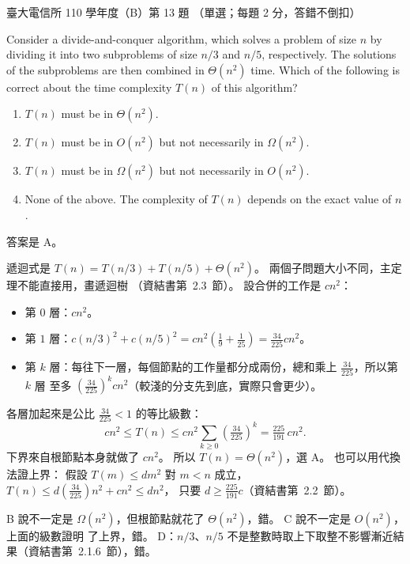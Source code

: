 \begin{pastexam}[label={px:ntu-110-comm-dsa-13}]{臺大電信所 110 學年度（B）第 13 題}
（單選；每題 2 分，答錯不倒扣）

Consider a divide-and-conquer algorithm, which solves a problem of size $n$ by dividing it into two subproblems of size $n/3$ and $n/5$, respectively. The solutions of the subproblems are then combined in $\Theta(n^2)$ time. Which of the following is correct about the time complexity $T(n)$ of this algorithm?
\begin{enumerate}[label=\Alph*.]
\item $T(n)$ must be in $\Theta(n^2)$.
\item $T(n)$ must be in $O(n^2)$ but not necessarily in $\Omega(n^2)$.
\item $T(n)$ must be in $\Omega(n^2)$ but not necessarily in $O(n^2)$.
\item None of the above. The complexity of $T(n)$ depends on the exact value of $n$.
\end{enumerate}
\end{pastexam}

\begin{pastsoln}
答案是 A。

遞迴式是 $T(n) = T(n/3) + T(n/5) + \Theta(n^2)$。 兩個子問題大小不同，主定理不能直接用，畫遞迴樹
（資結書第~2.3~節）。 設合併的工作是 $cn^2$：
\begin{itemize}
\item 第 $0$ 層：$cn^2$。
\item 第 $1$ 層：$c(n/3)^2 + c(n/5)^2 = cn^2\left(\tfrac19 + \tfrac1{25}\right) = \tfrac{34}{225}cn^2$。
\item 第 $k$ 層：每往下一層，每個節點的工作量都分成兩份，總和乘上 $\tfrac{34}{225}$，所以第 $k$ 層
至多 $\left(\tfrac{34}{225}\right)^k cn^2$（較淺的分支先到底，實際只會更少）。
\end{itemize}
各層加起來是公比 $\tfrac{34}{225} < 1$ 的等比級數：
\[
cn^2 \le T(n) \le cn^2 \sum_{k \ge 0} \left(\tfrac{34}{225}\right)^k = \tfrac{225}{191}\,cn^2.
\]
下界來自根節點本身就做了 $cn^2$。 所以 $T(n) = \Theta(n^2)$，選 A。 也可以用代換法證上界：
假設 $T(m) \le dm^2$ 對 $m < n$ 成立，$T(n) \le d\left(\tfrac{34}{225}\right)n^2 + cn^2 \le dn^2$，
只要 $d \ge \tfrac{225}{191}c$（資結書第~2.2~節）。

B 說不一定是 $\Omega(n^2)$，但根節點就花了 $\Theta(n^2)$，錯。 C 說不一定是 $O(n^2)$，上面的級數證明
了上界，錯。 D：$n/3$、$n/5$ 不是整數時取上下取整不影響漸近結果（資結書第~2.1.6~節），錯。
\end{pastsoln}
